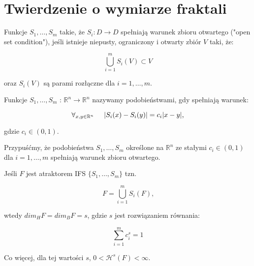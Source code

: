 \documentclass{mini}
\begin{document}
\chapter{Twierdzenie o wymiarze fraktali}


\begin{df}\label{osc}

Funkcje $S_1,\ldots,S_m$ takie, że $S_i:D \longrightarrow D$ spełniają warunek zbioru otwartego ("open set condition"), jeśli istnieje niepusty, ograniczony i otwarty zbiór $V$ taki, że:

\begin{equation}
\bigcup^{m}_{i=1}S_i(V) \subset V
\end{equation}

oraz $S_i(V)$ są parami rozłączne dla $i=1,\ldots,m$.
 
\end{df}


\begin{df}

Funkcje $S_1,\ldots,S_m$ : $\mathbb{R}^n\longrightarrow\mathbb{R}^n$ nazywamy podobieństwami, gdy spełniają warunek:

\begin{equation}
\forall_{x,y \in \mathbb{R}^n}\hspace{5mm} |S_i(x)-S_i(y)|=c_i|x-y|\textrm{,}
\end{equation}

gdzie $c_i \in (0,1)$.

\end{df}


\begin{tw}\label{wym}

Przypuśćmy, że podobieństwa $S_1,\ldots,S_m$ określone na $\mathbb{R}^n$ ze stałymi $c_i \in (0,1)$ dla $i=1,\ldots,m$ spełniają warunek zbioru otwartego.

Jeśli $F$ jest atraktorem IFS $\lbrace S_1,\ldots,S_m\rbrace$ tzn. 

\begin{equation}\label{f}
F = \bigcup^{m}_{i=1}{S_i(F)} \textrm{,}
\end{equation}

wtedy $dim_HF=dim_BF=s$, gdzie $s$ jest rozwiązaniem równania:

\begin{equation}\label{s}
\sum^m_{i=1}c_i^s=1
\end{equation}

Co więcej, dla tej wartości $s$, $0<\mathcal{H}^s(F)<\infty$.

\end{tw}
\end{document}
